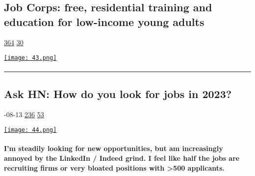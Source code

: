 \documentclass[10pt,a4paper]{article}
\begin{document}
\begin{multicols*}{2}
\begin{minipage}{\linewidth}
\subsection{Job Corps: free, residential training and education for low-income young adults}
\textsc{\footnotesize
{\scriptsize\faThumbsOUp}\space 
\href{http://news.ycombinator.com/item?id=37166478\&utm\_term=comment}{364} 
{\scriptsize\faComments}\space 
\href{http://news.ycombinator.com/item?id=37166478\&utm\_term=comment}{30} 
}
\par\medskip\noindent
\href{https://www.jobcorps.gov/?utm\_source=hackernewsletter\&utm\_medium=email\&utm\_term=working}{
    \texttt{[image: 43.png]}
}
\end{minipage}
\paragraph{}

\par\noindent\textcolor{red}{\rule{\linewidth}{0.2mm}}
\vfill
\null
\noindent\begin{minipage}{\linewidth}
\subsection{Ask HN: How do you look for jobs in 2023?}
\textsc{\footnotesize
{\scriptsize\faCalendar}-08-13 
{\scriptsize\faThumbsOUp}\space 
\href{http://news.ycombinator.com/item?id=37166478\&utm\_term=comment}{236} 
{\scriptsize\faComments}\space 
\href{http://news.ycombinator.com/item?id=37166478\&utm\_term=comment}{53} 
}
\par\medskip\noindent
\href{https://news.ycombinator.com/item?id=37111256\&utm\_source=hackernewsletter\&utm\_medium=email\&utm\_term=working}{
    \texttt{[image: 44.png]}
}
\end{minipage}
\paragraph{}
\textbf{I’m steadily looking for new opportunities, but am increasingly annoyed by the LinkedIn / Indeed grind. I feel like half the jobs are recruiting firms or very bloated positions with >500 applicants.}
\paragraph{}


\end{multicols*}
\end{document}
